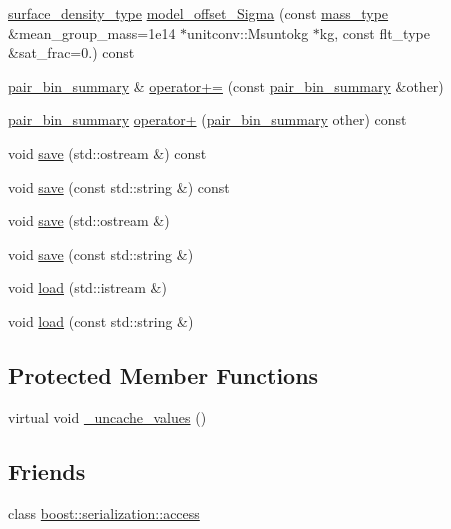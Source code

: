 \begin{DoxyCompactItemize}
\hyperlink{namespaceIceBRG_a80c597ef5ba0a32491d32a9f0083b02d}{surface\-\_\-density\-\_\-type} \hyperlink{classIceBRG_1_1pair__bin__summary_a2384801bfcfa8e9fb6ef15b32f7b82ac}{model\-\_\-offset\-\_\-\-Sigma} (const \hyperlink{namespaceIceBRG_a1be72ac4918a9b029f2eefa084213e35}{mass\-\_\-type} \&mean\-\_\-group\-\_\-mass=1e14 $\ast$unitconv\-::\-Msuntokg $\ast$kg, const flt\-\_\-type \&sat\-\_\-frac=0.) const 
\item 
\hyperlink{classIceBRG_1_1pair__bin__summary}{pair\-\_\-bin\-\_\-summary} \& \hyperlink{classIceBRG_1_1pair__bin__summary_aebc85a791164a79fc26ed9997cb26acf}{operator+=} (const \hyperlink{classIceBRG_1_1pair__bin__summary}{pair\-\_\-bin\-\_\-summary} \&other)
\item 
\hyperlink{classIceBRG_1_1pair__bin__summary}{pair\-\_\-bin\-\_\-summary} \hyperlink{classIceBRG_1_1pair__bin__summary_a908cb3b78cca4798d9338530c884d3bd}{operator+} (\hyperlink{classIceBRG_1_1pair__bin__summary}{pair\-\_\-bin\-\_\-summary} other) const 
\item 
void \hyperlink{classIceBRG_1_1pair__bin__summary_a818fdce6a248c3a038d5a6b0dae20cb7}{save} (std\-::ostream \&) const 
\item 
void \hyperlink{classIceBRG_1_1pair__bin__summary_adf616ef4c4ad5da5fcb8c2048cc18cec}{save} (const std\-::string \&) const 
\item 
void \hyperlink{classIceBRG_1_1pair__bin__summary_aaba4acba6e02ac0a8f3c2e79b0d3b559}{save} (std\-::ostream \&)
\item 
void \hyperlink{classIceBRG_1_1pair__bin__summary_ae531783a2847f3db8964cc530996915b}{save} (const std\-::string \&)
\item 
void \hyperlink{classIceBRG_1_1pair__bin__summary_a9189bd4f00779f2a97ed6861a403d7f8}{load} (std\-::istream \&)
\item 
void \hyperlink{classIceBRG_1_1pair__bin__summary_a074dc6d7125ba31b2bb1243d46b09f70}{load} (const std\-::string \&)
\end{DoxyCompactItemize}
\subsection*{Protected Member Functions}
\begin{DoxyCompactItemize}
\item 
virtual void \hyperlink{classIceBRG_1_1pair__bin__summary_a3e0113d3900e9eebb0f80d5681e6dd95}{\-\_\-uncache\-\_\-values} ()
\end{DoxyCompactItemize}
\subsection*{Friends}
\begin{DoxyCompactItemize}
\item 
class \hyperlink{classIceBRG_1_1pair__bin__summary_ac98d07dd8f7b70e16ccb9a01abf56b9c}{boost\-::serialization\-::access}
\end{DoxyCompactItemize}


